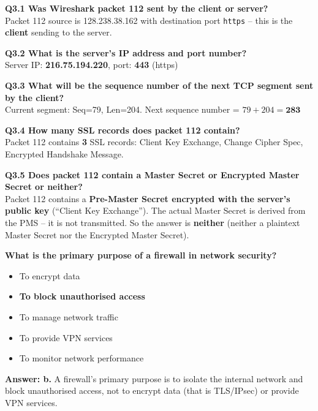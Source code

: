 \begin{tcolorbox}[exambox, title=V24 Q3 -- SSL/TLS Wireshark Analysis]
\textbf{Q3.1 Was Wireshark packet 112 sent by the client or server?}\\
Packet 112 source is 128.238.38.162 with destination port \texttt{https} -- this is the \textbf{client} sending to the server.

\textbf{Q3.2 What is the server's IP address and port number?}\\
Server IP: \textbf{216.75.194.220}, port: \textbf{443} (https)

\textbf{Q3.3 What will be the sequence number of the next TCP segment sent by the client?}\\
Current segment: Seq=79, Len=204. Next sequence number = $79 + 204 = \mathbf{283}$

\textbf{Q3.4 How many SSL records does packet 112 contain?}\\
Packet 112 contains \textbf{3} SSL records: Client Key Exchange, Change Cipher Spec, Encrypted Handshake Message.

\textbf{Q3.5 Does packet 112 contain a Master Secret or Encrypted Master Secret or neither?}\\
Packet 112 contains a \textbf{Pre-Master Secret encrypted with the server's public key} (``Client Key Exchange''). The actual Master Secret is derived from the PMS -- it is not transmitted. So the answer is \textbf{neither} (neither a plaintext Master Secret nor the Encrypted Master Secret).
\end{tcolorbox}

\begin{tcolorbox}[exambox, title=S2025 Q14 -- Primary Purpose of a Firewall]
\textbf{What is the primary purpose of a firewall in network security?}
\begin{itemize}[noitemsep]
  \item[a)] To encrypt data
  \item[\textbf{b)}] \textbf{To block unauthorised access} \checkmark
  \item[c)] To manage network traffic
  \item[d)] To provide VPN services
  \item[e)] To monitor network performance
\end{itemize}
\textbf{Answer: b.} A firewall's primary purpose is to isolate the internal network and block unauthorised access, not to encrypt data (that is TLS/IPsec) or provide VPN services.
\end{tcolorbox}

